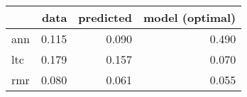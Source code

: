 \begin{tabular}{lrrr}
\toprule
{} &   data &  predicted &  model (optimal) \\
\midrule
ann &  0.115 &      0.090 &            0.490 \\
ltc &  0.179 &      0.157 &            0.070 \\
rmr &  0.080 &      0.061 &            0.055 \\
\bottomrule
\end{tabular}
